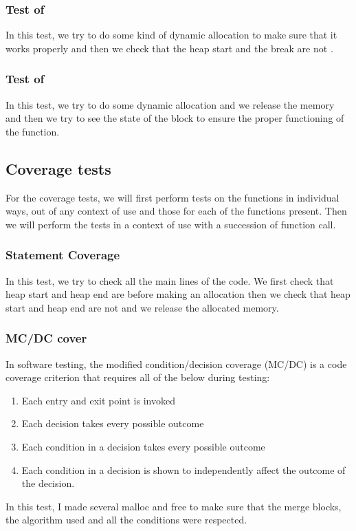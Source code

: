 \subsubsection{Test of }
In this test, we try to do some kind of dynamic allocation to make sure that it works properly and then we check that the heap start and the break are not .

\subsubsection{Test of }
In this test, we try to do some dynamic allocation and we release the memory and then we try to see the state of the block to ensure the proper functioning of the function.


\subsection{Coverage tests}

For the coverage tests, we will first perform tests on the functions in individual ways, out of any context of use and those for each of the functions present.
Then we will perform the tests in a context of use with a succession of function call.

\subsubsection{Statement Coverage}
In this test, we try to check all the main lines of the code. We first check that heap start and heap end are  before making an allocation then we check that heap start and heap end are not  and we release the allocated memory.

\subsubsection{MC/DC cover}
In software testing, the modified condition/decision coverage (MC/DC) is a code coverage criterion that requires all of the below during testing:
\begin{enumerate}
\item Each entry and exit point is invoked
\item Each decision takes every possible outcome
\item Each condition in a decision takes every possible outcome
\item Each condition in a decision is shown to independently affect the outcome of the decision.
\end{enumerate}

In this test, I made several malloc and free to make sure that the merge blocks, the algorithm used and all the conditions were respected.
